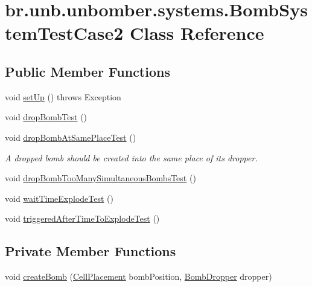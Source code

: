 \hypertarget{classbr_1_1unb_1_1unbomber_1_1systems_1_1_bomb_system_test_case2}{\section{br.\+unb.\+unbomber.\+systems.\+Bomb\+System\+Test\+Case2 Class Reference}
\label{classbr_1_1unb_1_1unbomber_1_1systems_1_1_bomb_system_test_case2}
}
\subsection*{Public Member Functions}
\begin{DoxyCompactItemize}
\item 
void \hyperlink{classbr_1_1unb_1_1unbomber_1_1systems_1_1_bomb_system_test_case2_a49058b8c20b3aed28fe1b17db0767c32}{set\+Up} ()  throws Exception 
\item 
void \hyperlink{classbr_1_1unb_1_1unbomber_1_1systems_1_1_bomb_system_test_case2_a2b0f3b75bc0d08145bd0665e97b9f8cf}{drop\+Bomb\+Test} ()
\item 
void \hyperlink{classbr_1_1unb_1_1unbomber_1_1systems_1_1_bomb_system_test_case2_a6225b9440d3e582e8401937b910f73f6}{drop\+Bomb\+At\+Same\+Place\+Test} ()
\begin{DoxyCompactList}\small\item\em A dropped bomb should be created into the same place of its dropper. \end{DoxyCompactList}\item 
void \hyperlink{classbr_1_1unb_1_1unbomber_1_1systems_1_1_bomb_system_test_case2_a0163ec764ded7be5213e24f196392c73}{drop\+Bomb\+Too\+Many\+Simultaneous\+Bombs\+Test} ()
\item 
void \hyperlink{classbr_1_1unb_1_1unbomber_1_1systems_1_1_bomb_system_test_case2_a6251f215f10424237000348d3fba6817}{wait\+Time\+Explode\+Test} ()
\item 
void \hyperlink{classbr_1_1unb_1_1unbomber_1_1systems_1_1_bomb_system_test_case2_a8842b92e680ebfa498ac6bf385435994}{triggered\+After\+Time\+To\+Explode\+Test} ()
\end{DoxyCompactItemize}
\subsection*{Private Member Functions}
\begin{DoxyCompactItemize}
\item 
void \hyperlink{classbr_1_1unb_1_1unbomber_1_1systems_1_1_bomb_system_test_case2_ac387be6c327ed198dba0b980dc57356e}{create\+Bomb} (\hyperlink{classbr_1_1unb_1_1unbomber_1_1component_1_1_cell_placement}{Cell\+Placement} bomb\+Position, \hyperlink{classbr_1_1unb_1_1unbomber_1_1component_1_1_bomb_dropper}{Bomb\+Dropper} dropper)
\end{DoxyCompactItemize}


